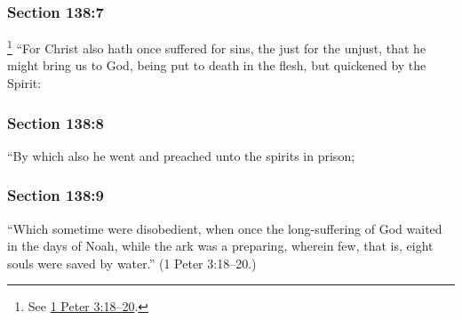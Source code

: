 	\subsubsection{Section 138:7} %
		\label{DC138-7}

			\footnote{%
				See \hyperref[1PETER-3-18]{1 Peter 3:18--20}.
				}%
		``For Christ also hath once suffered for sins, the just for the unjust, that he might bring us to God, being put to death in the flesh, but quickened by the Spirit:


	\subsubsection{Section 138:8} %
		\label{DC138-8}

		``By which also he went and preached unto the spirits in prison;


	\subsubsection{Section 138:9} %
		\label{DC138-9}

		``Which sometime were disobedient, when once the long-suffering of God waited in the days of Noah, while the ark was a preparing, wherein few, that is, eight souls were saved by water.'' (1 Peter 3:18--20.)


